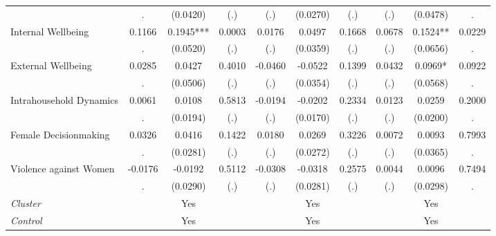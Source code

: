 \begin{tabular}{l*{9}{c}}
  & . & (0.0420) & (.) & (.) & (0.0270) & (.) & (.) & (0.0478) & . \\
Internal Wellbeing & 0.1166 & 0.1945*** & 0.0003 & 0.0176 & 0.0497 & 0.1668 & 0.0678 & 0.1524** & 0.0229 \\
  & . & (0.0520) & (.) & (.) & (0.0359) & (.) & (.) & (0.0656) & . \\
External Wellbeing & 0.0285 & 0.0427 & 0.4010 & -0.0460 & -0.0522 & 0.1399 & 0.0432 & 0.0969* & 0.0922 \\
  & . & (0.0506) & (.) & (.) & (0.0354) & (.) & (.) & (0.0568) & . \\
Intrahousehold Dynamics & 0.0061 & 0.0108 & 0.5813 & -0.0194 & -0.0202 & 0.2334 & 0.0123 & 0.0259 & 0.2000 \\
  & . & (0.0194) & (.) & (.) & (0.0170) & (.) & (.) & (0.0200) & . \\
Female Decisionmaking & 0.0326 & 0.0416 & 0.1422 & 0.0180 & 0.0269 & 0.3226 & 0.0072 & 0.0093 & 0.7993 \\
  & . & (0.0281) & (.) & (.) & (0.0272) & (.) & (.) & (0.0365) & . \\
Violence against Women & -0.0176 & -0.0192 & 0.5112 & -0.0308 & -0.0318 & 0.2575 & 0.0044 & 0.0096 & 0.7494 \\
  & . & (0.0290) & (.) & (.) & (0.0281) & (.) & (.) & (0.0298) & . \\
\hline \textit{Cluster} & & Yes &  & & Yes &  & & Yes &  \\ \textit{Control} & & Yes &  & & Yes &  & & Yes &   \\ \hline \end{tabular}
